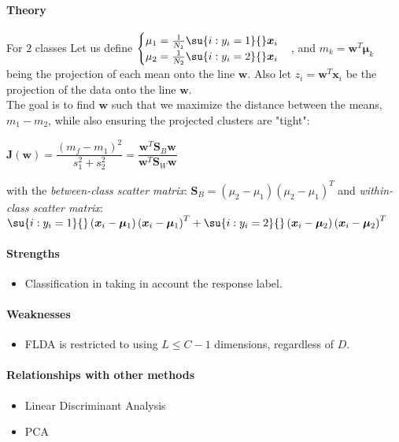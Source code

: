 \paragraph{Theory}
For $2$ classes
Let us define 
$\begin{cases}
    \mu_{1} = \frac{1}{N_{1}}\su{i:y_{i}=1}{}\bm{x}_{i}\\
    \mu_{2} = \frac{1}{N_{2}}\su{i:y_{i}=2}{}\bm{x}_{i}
\end{cases}$,
and $m_{k} = \bm{w}^{T}\bm{\mu}_{k}$ being the projection of each mean onto the line
$\bm{w}$. Also let $z_{i}=\bm{w}^{T}\bm{x}_{i}$ be the projection of the data onto the 
line $\bm{w}$.\\
The goal is to find $\bm{w}$ such that we maximize the distance between the means,
$m_{1} - m_{2}$, while also ensuring the projected clusters are "tight":
\begin{center}
    $\bm{J}(\bm{w}) = \dfrac{(m_{f} - m_{1})^{2}}{s_{1}^{2} + s_{2}^{2}}
    = \dfrac{\bm{w}^{T}\bm{S}_{B}\bm{w}}{\bm{w}^{T}\bm{S}_{W}\bm{w}}$
\end{center}
with the \emph{between-class scatter matrix}: $\bm{S}_{B} = \left(\mu_{2} - \mu_{1}
\right)\left(\mu_{2} - \mu_{1}\right)^{T}$ and \emph{within-class scatter matrix}:
$
\su{i:y_{i}=1}{}\left(\bm{x}_{i} - \bm{\mu}_{1}\right) \left(\bm{x}_{i} - 
\bm{\mu}_{1}\right)^{T} + \su{i:y_{i}=2}{}\left(\bm{x}_{i} - \bm{\mu}_{2}\right)\left(
\bm{x}_{i} - \bm{\mu}_{2}\right)^{T}
$


\paragraph{Strengths}
\begin{itemize}
    \item Classification in taking in account the response label.
\end{itemize}

\paragraph{Weaknesses}
\begin{itemize}
    \item FLDA is restricted to using $L\leq C-1$ dimensions, regardless of $D$.
\end{itemize}

\paragraph{Relationships with other methods}
\begin{itemize}
    \item Linear Discriminant Analysis
    \item PCA
\end{itemize}


